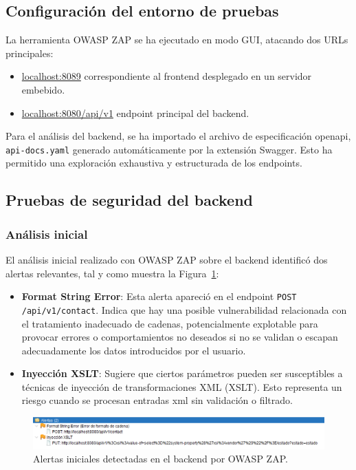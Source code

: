 \subsection{Configuración del entorno de pruebas}
La herramienta OWASP ZAP se ha ejecutado en modo GUI, atacando dos URLs principales:
\begin{itemize}
    \item \url{localhost:8089} correspondiente al frontend desplegado en un servidor embebido.
    \item \url{localhost:8080/api/v1} endpoint principal del \gls{backend}.
\end{itemize}
Para el análisis del \gls{backend}, se ha importado el archivo de especificación \gls{openapi}, \texttt{api-docs.yaml} generado automáticamente por la extensión Swagger. Esto ha permitido una exploración exhaustiva y estructurada de los endpoints.

\subsection{Pruebas de seguridad del backend}

\subsubsection{Análisis inicial}
El análisis inicial realizado con OWASP ZAP sobre el \gls{backend} identificó dos alertas relevantes, tal y como muestra la Figura~\ref{fig:alertas-zap-backend-iniciales}:

\begin{itemize}
  \item \textbf{Format String Error}: Esta alerta apareció en el endpoint \texttt{POST /api/v1/contact}. Indica que hay una posible vulnerabilidad relacionada con el tratamiento inadecuado de cadenas, potencialmente explotable para provocar errores o comportamientos no deseados si no se validan o escapan adecuadamente los datos introducidos por el usuario.
  
  \item \textbf{Inyección XSLT}: Sugiere que ciertos parámetros pueden ser susceptibles a técnicas de inyección de transformaciones XML (XSLT). Esto representa un riesgo cuando se procesan entradas \gls{xml} sin validación o filtrado.
\end{itemize}

\begin{figure}[h!tb]
    \centering
    \includegraphics[width=1\textwidth]{figs/alertas_previo.png}
    \caption{Alertas iniciales detectadas en el backend por OWASP ZAP.\label{fig:alertas-zap-backend-iniciales}}
\end{figure}



